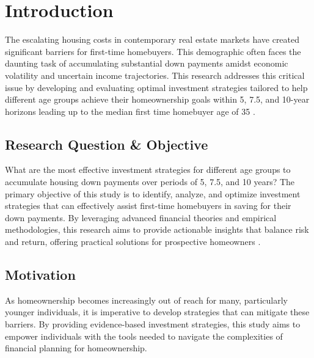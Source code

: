 \section{Introduction}
The escalating housing costs in contemporary real estate markets have created significant barriers for first-time homebuyers. This demographic often faces the daunting task of accumulating substantial down payments amidst economic volatility and uncertain income trajectories. This research addresses this critical issue by developing and evaluating optimal investment strategies tailored to help different age groups achieve their homeownership goals within 5, 7.5, and 10-year horizons leading up to the median first time homebuyer age of 35 \citep{NAR2023}.

\subsection{Research Question \& Objective}
What are the most effective investment strategies for different age groups to accumulate housing down payments over periods of 5, 7.5, and 10 years? The primary objective of this study is to identify, analyze, and optimize investment strategies that can effectively assist first-time homebuyers in saving for their down payments. By leveraging advanced financial theories and empirical methodologies, this research aims to provide actionable insights that balance risk and return, offering practical solutions for prospective homeowners \citep{markowitz1952portfolio, sharpe1964capital, boyle1977options}.

\subsection{Motivation}
As homeownership becomes increasingly out of reach for many, particularly younger individuals, it is imperative to develop strategies that can mitigate these barriers. By providing evidence-based investment strategies, this study aims to empower individuals with the tools needed to navigate the complexities of financial planning for homeownership.


\newpage
